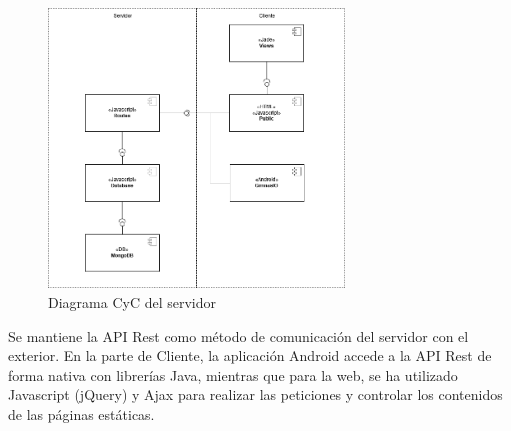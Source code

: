 \documentclass[11pt,a4paper]{report}
\begin{document}
\begin{figure}[H]
	\centering
	\includegraphics[width=0.7\textwidth]{graficos/CyCserver.png}
	\caption{Diagrama CyC del servidor }
	\label{fig: CyCServ2}
\end{figure}
Se mantiene la API Rest como método de comunicación del servidor con el exterior. En la parte de Cliente, la aplicación Android accede a la API Rest de forma nativa con librerías Java, mientras que para la web, se ha utilizado Javascript (jQuery) y Ajax para realizar las peticiones y controlar los contenidos de las páginas estáticas.
\end{document}
